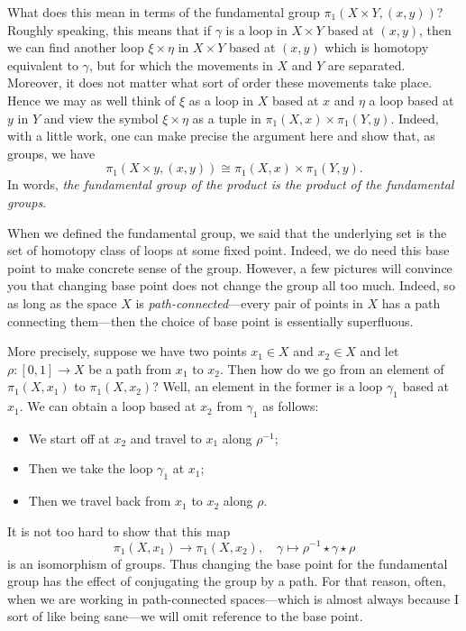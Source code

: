\documentclass{axolotl}
\begin{document}
What does this mean in terms of the fundamental group \(\pi_1(X \times Y, (x,y))\)?
Roughly speaking, this means that if \(\gamma\) is a loop in \(X \times Y\)
based at \((x,y)\), then we can find another loop \(\xi \times \eta\) in \(X \times Y\)
based at \((x,y)\) which is homotopy equivalent to \(\gamma\), but for which the
movements in \(X\) and \(Y\) are separated. Moreover, it does not matter what sort
of order these movements take place. Hence we may as well think of \(\xi\) as a
loop in \(X\) based at \(x\) and \(\eta\) a loop based at \(y\) in \(Y\) and view
the symbol \(\xi \times \eta\) as a tuple in \(\pi_1(X,x) \times \pi_1(Y,y)\).
Indeed, with a little work, one can make precise the argument here and show
that, as groups, we have
\[ \pi_1(X \times y, (x,y)) \cong \pi_1(X,x) \times \pi_1(Y,y). \]
In words, \emph{the fundamental group of the product is the product of the
  fundamental groups}.

When we defined the fundamental group, we said that the underlying set is the
set of homotopy class of loops at some fixed point. Indeed, we do need this
base point to make concrete sense of the group. However, a few pictures will
convince you that changing base point does not change the group all too much.
Indeed, so as long as the space \(X\) is \emph{path-connected}---every pair of
points in \(X\) has a path connecting them---then the choice of base point is
essentially superfluous.

More precisely, suppose we have two points \(x_1 \in X\) and \(x_2 \in X\)
and let \(\rho: [0,1] \to X\) be a path from \(x_1\) to \(x_2\). Then how do
we go from an element of \(\pi_1(X,x_1)\) to \(\pi_1(X,x_2)\)? Well, an element
in the former is a loop \(\gamma_1\) based at \(x_1\). We can obtain a loop based
at \(x_2\) from \(\gamma_1\) as follows:
\begin{itemize}
  \item We start off at \(x_2\) and travel to \(x_1\) along \(\rho^{-1}\);
  \item Then we take the loop \(\gamma_1\) at \(x_1\);
  \item Then we travel back from \(x_1\) to \(x_2\) along \(\rho\).
\end{itemize}
It is not too hard to show that this map
\[ \pi_1(X,x_1) \to \pi_1(X,x_2), \quad \gamma \mapsto \rho^{-1} \star \gamma \star \rho \]
is an isomorphism of groups. Thus changing the base point for the fundamental
group has the effect of conjugating the group by a path. For that reason,
often, when we are working in path-connected spaces---which is almost always
because I sort of like being sane---we will omit reference to the base point.
\end{document}
